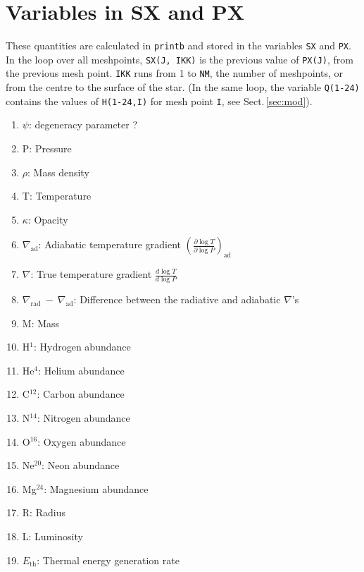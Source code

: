 \section{Variables in SX and PX}
\label{sec:sxpx}

These quantities are calculated in \texttt{printb} and stored in the variables
\texttt{SX} and \texttt{PX}.  In the loop over all meshpoints, \texttt{SX(J, IKK)} is the previous value 
of \texttt{PX(J)}, from the previous mesh point.
\texttt{IKK} runs from 1 to \texttt{NM}, the number of meshpoints, or from the centre to the 
surface of the star.  (In the same loop, the variable \texttt{Q(1-24)} contains the values
of \texttt{H(1-24,I)} for mesh point \texttt{I}, see Sect.\,\ref{sec:mod}).

\begin{enumerate}
\item $\psi$: degeneracy parameter ?
\item P: Pressure
\item $\rho$: Mass density
\item T: Temperature 
\item $\kappa$: Opacity
\item $\nabla_\mathrm{ad}$: Adiabatic temperature gradient  $\left(\frac{\partial\log T}{\partial\log P}\right)_\mathrm{ad}$
\item $\nabla$: True temperature gradient $\frac{d\log T}{d\log P}$
\item $\nabla_\mathrm{rad} ~-~ \nabla_\mathrm{ad}$: Difference between the radiative and adiabatic $\nabla$'s
\item M: Mass

\item H$^1$: Hydrogen abundance
\item He$^4$: Helium abundance
\item C$^{12}$: Carbon abundance
\item N$^{14}$: Nitrogen abundance
\item O$^{16}$: Oxygen abundance
\item Ne$^{20}$: Neon abundance
\item Mg$^{24}$: Magnesium abundance
\item R: Radius 
\item L: Luminosity 
\item $E_\mathrm{th}$: Thermal energy generation rate


\end{enumerate}
